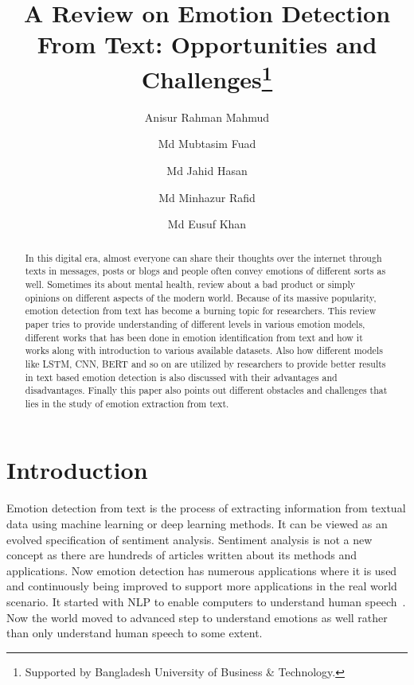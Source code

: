 \documentclass[runningheads]{llncs}
\begin{document}
%
\title{A Review on Emotion Detection From Text: Opportunities and Challenges\thanks{Supported by Bangladesh University of Business \& Technology.}}
%
%
\author{Anisur Rahman Mahmud \and
Md Mubtasim Fuad \and
Md Jahid Hasan \and Md Minhazur Rafid  \and Md Eusuf Khan  }
%
%
%
\maketitle              %
%
\begin{abstract}
In this digital era, almost everyone can share their thoughts over the internet through texts in messages, posts or blogs and people often convey emotions of different sorts as well. Sometimes its about mental health, review about a bad product or simply opinions on different aspects of the modern world. Because of its massive popularity, emotion detection from text has become a burning topic for researchers. This review paper tries to provide understanding of different levels in various emotion models, different works that has been done in emotion identification from text and how it works along with introduction to various available datasets. Also how different models like LSTM, CNN, BERT and so on are utilized by researchers to provide better results in text based emotion detection is also discussed with their advantages and disadvantages. Finally this paper also points out different obstacles and challenges that lies in the study of emotion extraction from text. 

\end{abstract}
%
%
%
\section{Introduction}
Emotion detection from text is the process of extracting information from textual data using machine learning or deep learning methods. It can be viewed as an evolved specification of sentiment analysis. Sentiment analysis is not a new concept as there are hundreds of articles written about its methods and applications. Now emotion detection has numerous applications where it is used and continuously being improved to support more applications in the real world scenario. It started with NLP to enable computers to understand human speech~\cite{ref_url1}. Now the world moved to advanced step to understand emotions as well rather than only understand human speech to some extent.
\end{document}
